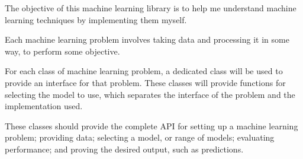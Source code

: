 \documentclass[../main.tex]{subfiles}
\begin{document}
The objective of this machine learning library is to help me understand machine learning techniques by implementing them myself.

Each machine learning problem involves taking data and processing it in some way, to perform some objective.

For each class of machine learning problem, a dedicated class will be used to provide an interface for that problem.
These classes will provide functions for selecting the model to use, which separates the interface of the problem and the implementation used.

These classes should provide the complete API for setting up a machine learning problem; providing data; selecting a model, or range of models; evaluating performance; and proving the desired output, such as predictions.
\end{document}
